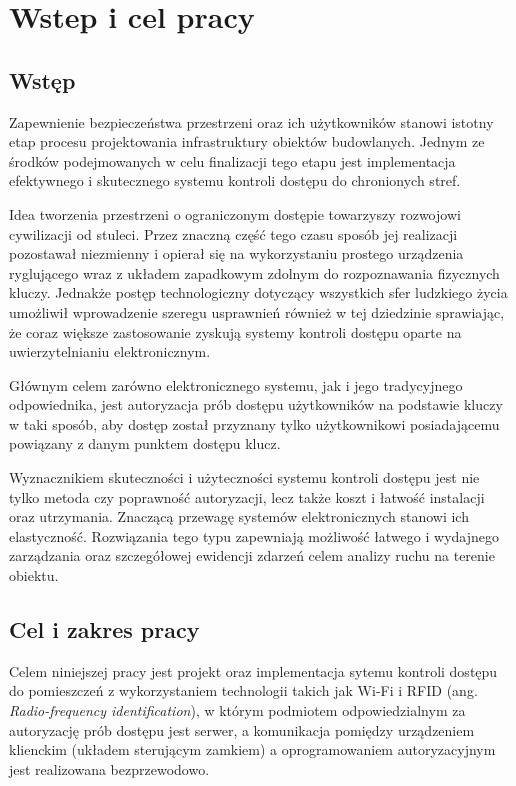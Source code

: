 \chapter{Wstep i cel pracy}
\label{chap:intro}

	\section{Wstęp}
		Zapewnienie bezpieczeństwa przestrzeni oraz ich użytkowników stanowi istotny etap procesu projektowania infrastruktury obiektów budowlanych. Jednym ze środków podejmowanych w celu finalizacji tego etapu jest implementacja efektywnego i skutecznego systemu kontroli dostępu do chronionych stref.

		Idea tworzenia przestrzeni o ograniczonym dostępie towarzyszy rozwojowi cywilizacji od stuleci. Przez znaczną część tego czasu sposób jej realizacji pozostawał niezmienny i opierał się na wykorzystaniu prostego urządzenia ryglującego wraz z układem zapadkowym zdolnym do rozpoznawania fizycznych kluczy. Jednakże postęp technologiczny dotyczący wszystkich sfer ludzkiego życia umożliwił wprowadzenie szeregu usprawnień również w tej dziedzinie sprawiając, że coraz większe zastosowanie zyskują systemy kontroli dostępu oparte na uwierzytelnianiu elektronicznym.

		Głównym celem zarówno elektronicznego systemu, jak i jego tradycyjnego odpowiednika, jest autoryzacja prób dostępu użytkowników na podstawie kluczy w taki sposób, aby dostęp został przyznany tylko użytkownikowi posiadającemu powiązany z danym punktem dostępu klucz.

		Wyznacznikiem skuteczności i użyteczności systemu kontroli dostępu jest nie tylko metoda czy poprawność autoryzacji, lecz także koszt i łatwość instalacji oraz utrzymania. Znaczącą przewagę systemów elektronicznych stanowi ich elastyczność. Rozwiązania tego typu zapewniają możliwość łatwego i wydajnego zarządzania oraz szczegółowej ewidencji zdarzeń celem analizy ruchu na terenie obiektu.

	\section{Cel i zakres pracy}

		Celem niniejszej pracy jest projekt oraz implementacja sytemu kontroli dostępu do pomieszczeń z wykorzystaniem technologii takich jak Wi-Fi i RFID (ang. \textit{Radio-frequency identification}), w którym podmiotem odpowiedzialnym za autoryzację prób dostępu jest serwer, a komunikacja pomiędzy urządzeniem klienckim (układem sterującym zamkiem) a oprogramowaniem autoryzacyjnym jest realizowana bezprzewodowo.

